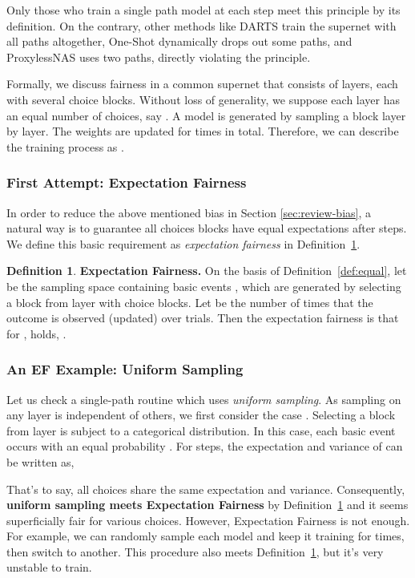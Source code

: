 \documentclass[10pt,twocolumn,letterpaper]{article}
\theoremstyle{definition}
\newtheorem{definition}{Definition}[section]
\begin{document}
Only those who train a single path model at each step meet this principle by its definition. On the contrary, other methods like DARTS \cite{liu2018darts} train the supernet with all paths altogether, One-Shot \cite{bender2018understanding} dynamically drops out some paths,  and ProxylessNAS \cite{cai2018proxylessnas} uses two paths, directly violating the principle.


Formally, we discuss fairness in a common supernet that consists of  layers, each with several choice blocks. Without loss of generality, we suppose each layer has an equal number of choices, say . A model is generated by sampling a block layer by layer. The weights are updated for  times in total. Therefore, we can describe the training process as . 





\subsubsection{First Attempt: Expectation Fairness}
In order to reduce the above mentioned bias in Section \ref{sec:review-bias}, a natural way is to guarantee all choices blocks have equal expectations after  steps. We define this basic requirement as \emph{expectation fairness} in Definition~\ref{def:ef}.
\begin{definition}
	\label{def:ef}
	\textbf{Expectation Fairness.} On the basis of Definition~\ref{def:equal}, let  be the sampling space containing  basic events , which are generated by selecting a block from layer  with  choice blocks.
	Let  be the number of times that the outcome  is observed (updated) over  trials. 
	Then the expectation fairness is that for ,  holds, .
\end{definition}

\subsubsection{An EF Example: Uniform Sampling}

Let us check a single-path routine \cite{guo2019single} which uses \emph{uniform sampling}. As sampling on any layer  is independent of others, we first consider the case . Selecting a block from layer  is subject to a categorical distribution. 
In this case, each basic event occurs with an equal probability . For  steps, the expectation and variance of  can be written as,


That's to say, all choices share the same expectation and variance. Consequently, \textbf{uniform sampling meets Expectation Fairness} by Definition~\ref{def:ef} and it seems superficially fair for various choices. However,  Expectation Fairness is not enough. For example, we can randomly sample each model and keep it training for  times, then switch to another. This procedure also meets Definition~\ref{def:ef}, but it's very unstable to train.
\end{document}
